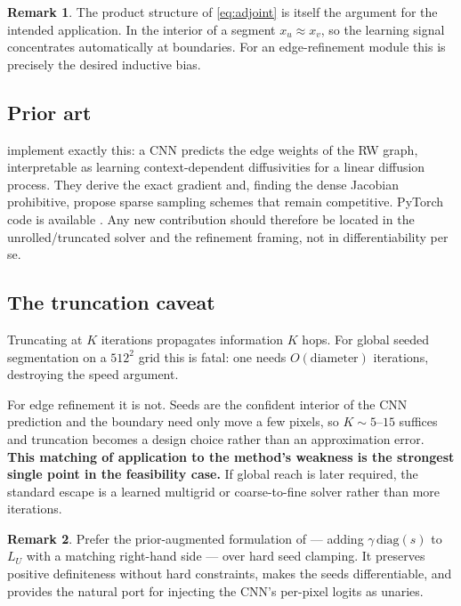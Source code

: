 \documentclass[11pt,a4paper]{article}
\newcommand{\Lap}{L}
\newcommand{\LU}{\Lap_{U}}
\theoremstyle{definition}
\newtheorem{remark}{Remark}
\begin{document}
\begin{remark}
The product structure of \eqref{eq:adjoint} is itself the argument for
the intended application. In the interior of a segment $x_u \approx x_v$,
so the learning signal concentrates automatically at boundaries. For an
edge-refinement module this is precisely the desired inductive bias.
\end{remark}

\subsection{Prior art}

\citet{cerrone2019learned} implement exactly this: a CNN predicts the
edge weights of the RW graph, interpretable as learning context-dependent
diffusivities for a linear diffusion process. They derive the exact
gradient and, finding the dense Jacobian prohibitive, propose sparse
sampling schemes that remain competitive. PyTorch code is
available \citep{cerrone2019code}. Any new contribution should therefore
be located in the unrolled/truncated solver and the refinement framing,
not in differentiability per se.

\subsection{The truncation caveat}

Truncating at $K$ iterations propagates information $K$ hops. For global
seeded segmentation on a $512^2$ grid this is fatal: one needs
$O(\mathrm{diameter})$ iterations, destroying the speed argument.

For edge refinement it is not. Seeds are the confident interior of the
CNN prediction and the boundary need only move a few pixels, so
$K \sim 5$--$15$ suffices and truncation becomes a design choice rather
than an approximation error. \textbf{This matching of application to the
method's weakness is the strongest single point in the feasibility case.}
If global reach is later required, the standard escape is a learned
multigrid or coarse-to-fine solver rather than more iterations.

\begin{remark}
Prefer the prior-augmented formulation of \citet{grady2005multilabel} ---
adding $\gamma\,\mathrm{diag}(s)$ to $\LU$ with a matching right-hand
side --- over hard seed clamping. It preserves positive definiteness
without hard constraints, makes the seeds differentiable, and provides
the natural port for injecting the CNN's per-pixel logits as unaries.
\end{remark}
\end{document}
